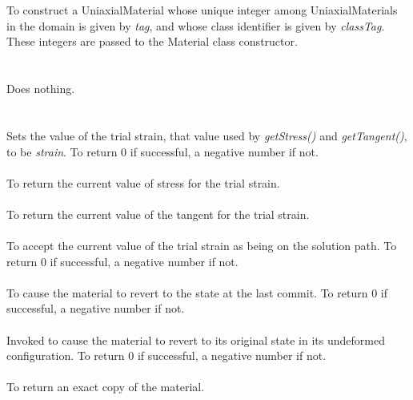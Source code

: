   \\
  \\
To construct a UniaxialMaterial whose unique integer among
UniaxialMaterials in the domain is given by {\em tag}, and whose class
identifier is given by {\em classTag}. These integers are passed to
the Material class constructor. \\

 \\
 \\
Does nothing. \\ 

 \\
  \\
Sets the value of the trial strain, that value used by {\em
getStress()} and {\em getTangent()}, to be {\em strain}. To
return $0$ if successful, a negative number if not. \\

 \\
To return the current value of stress for the trial strain. \\

 \\
To return the current value of the tangent for the trial strain. \\

 \\
To accept the current value of the trial strain as being on the
solution path. To return $0$ if successful, a negative number if not. \\

 \\
To cause the material to revert to the state at the last commit. To
return $0$ if successful, a negative number if not. \\

 \\
Invoked to cause the material to revert to its original state in its
undeformed configuration. To return $0$ if successful, a negative
number if not. \\

 \\
To return an exact copy of the material. \\
